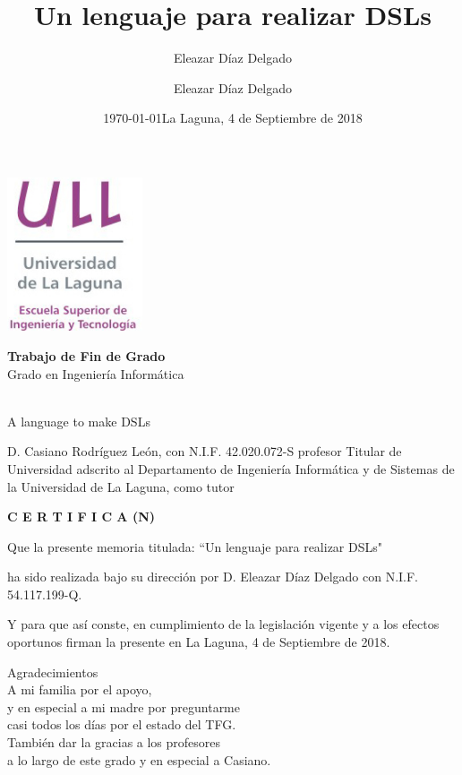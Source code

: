 \documentclass[11pt]{article}
\author{Eleazar Díaz Delgado }
\date{\today}
\title{}
\begin{document}
\title{Un lenguaje para realizar DSLs}
\author{Eleazar Díaz Delgado}

\date{La Laguna, 4 de Septiembre de 2018}

\makeatletter
\begin{titlepage}
    \includegraphics[width=40mm]{ull-logo.jpg}\\[4ex]
    \begin{center}
        {\huge \bfseries  Trabajo de Fin de Grado }\\[2ex]
        {\LARGE  Grado en Ingeniería Informática}\\[10ex]
    \end{center}
    \begin{flushright}
        {\huge \bfseries  \@title }\\[2ex]
        {\huge  A language to make DSLs }\\[2ex]
        {\LARGE  \@author}
    \end{flushright}
    \vfill
    \begin{center}
        {\LARGE \@date}
    \end{center}

\end{titlepage}
\makeatother
\thispagestyle{empty}
\newpage


D. Casiano Rodríguez León, con N.I.F. 42.020.072-S profesor Titular de Universidad adscrito al Departamento de Ingeniería Informática y de Sistemas de la Universidad de La Laguna, como tutor

{\large \bfseries C E R T I F I C A (N)}

Que la presente memoria titulada: “Un lenguaje para realizar DSLs"

ha sido realizada bajo su dirección por D. Eleazar Díaz Delgado
con N.I.F. 54.117.199-Q.

Y para que así conste, en cumplimiento de la legislación vigente y a los efectos oportunos firman la presente en La Laguna, 4 de Septiembre de 2018.
\newpage
\begin{flushright}
    {\huge  Agradecimientos }\\[2ex]
    A mi familia por el apoyo, \\
    y en especial a mi madre por preguntarme \\
    casi todos los días por el estado del TFG. \\
    \vspace{10mm} %
    También dar la gracias a los profesores \\
    a lo largo de este grado y en especial a Casiano. \\
\end{flushright}
\end{document}
